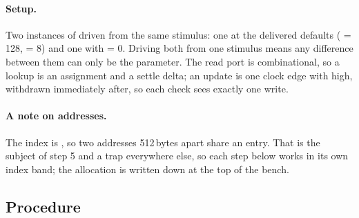 \paragraph{Setup.} Two instances of  driven from the
same stimulus: one at the delivered defaults ( = 128,
 = 8) and one with  = 0. Driving both from one
stimulus means any difference between them can only be the parameter. The read
port is combinational, so a lookup is an assignment and a settle delta; an
update is one clock edge with  high, withdrawn immediately
after, so each check sees exactly one write.

\paragraph{A note on addresses.} The index is , so two addresses
512\,bytes apart share an entry. That is the subject of step 5 and a trap
everywhere else, so each step below works in its own index band; the allocation
is written down at the top of the bench.

\subsection*{Procedure}

